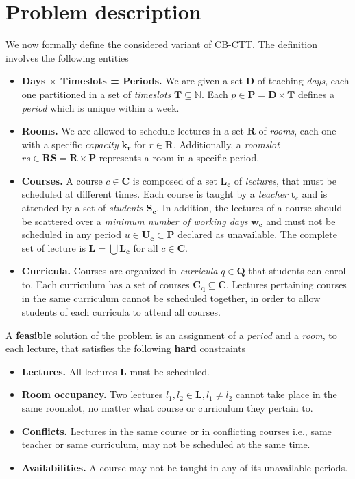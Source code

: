 \documentclass{llncs}
\begin{document}
\section{Problem description}\label{sec:problem}

We now formally define the considered variant of CB-CTT. The definition involves the following entities

\begin{itemize}
    \item \textbf{Days $\times$ Timeslots = Periods.} We are given a set $\mathbf{D}$ of teaching \emph{days}, each one partitioned in a set of \emph{timeslots} $\mathbf{T} \subseteq \mathbb{N}$. Each $p \in \mathbf{P} = \mathbf{D} \times \mathbf{T}$ defines a \emph{period} which is unique within a week.
    \item \textbf{Rooms.} We are allowed to schedule lectures in a set $\mathbf{R}$ of \emph{rooms}, each one with a specific \emph{capacity} $\mathbf{k_r}$ for $r \in \mathbf{R}$. Additionally, a \emph{roomslot} $rs \in \mathbf{RS} = \mathbf{R} \times \mathbf{P}$ represents a room in a specific period.
    \item \textbf{Courses.} A course $c \in \mathbf{C}$ is composed of a set $\mathbf{L_c}$ of \emph{lectures}, that must be scheduled at different times. Each course is taught by a \emph{teacher} $\mathbf{t}_c$ and is attended by a set of \emph{students} $\mathbf{S_c}$. In addition, the lectures of a course should be scattered over a \emph{minimum number of working days} $\mathbf{w_c}$ and must not be scheduled in any period $u \in \mathbf{U_c} \subset \mathbf{P}$ declared as unavailable. The complete set of lecture is $\mathbf{L} = \bigcup\mathbf{L_c}$ for all $c \in \mathbf{C}$.
    \item \textbf{Curricula.} Courses are organized in \emph{curricula} $q \in \mathbf{Q}$ that students can enrol to. Each curriculum has a set of courses $\mathbf{C_q} \subseteq \mathbf{C}$. Lectures pertaining courses in the same curriculum cannot be scheduled together, in order to allow students of each curricula to attend all courses.
\end{itemize}

\noindent
A \textbf{feasible} solution of the problem is an assignment of a \emph{period} and a \emph{room}, to each lecture, that satisfies the following \textbf{hard} constraints

\begin{itemize}
    \item \textbf{Lectures.} All lectures $\mathbf{L}$ must be scheduled.
    \item \textbf{Room occupancy.} Two lectures $l_1, l_2 \in \mathbf{L}, l_1 \neq l_2$ cannot take place in the same roomslot, no matter what course or curriculum they pertain to.
    \item \textbf{Conflicts.} Lectures in the same course or in conflicting courses i.e., same teacher or same curriculum, may not be scheduled at the same time.
    \item \textbf{Availabilities.} A course may not be taught in any of its unavailable periods.
\end{itemize}
\end{document}
